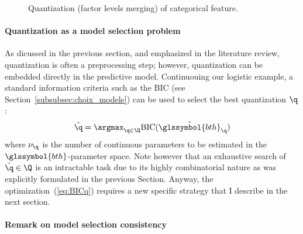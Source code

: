 \begin{figure}
\begin{multicols}{2}
\begin{minipage}{0.45\textwidth}
\caption{\label{fig:disc_disc} Quantization (factor levels merging) of categorical feature.}
\end{minipage}
\end{multicols}
\end{figure}




\paragraph{Quantization as a model selection problem} \label{par:model_selec}

As dicussed in the previous section, and emphasized in the literature review, quantization is often a preprocessing step; however, quantization can be embedded directly in the predictive model. Continuouing our logistic example, a standard information criteria such as the BIC (see Section~\ref{subsubsec:choix_modele}) can be used to select the best quantization $\q$:
\begin{equation}
    \label{eq:BICq}
    \hat{\q}=\argmax_{\q \in \Q} \text{BIC}(\hat{\glssymbol{bth}}_\q)
\end{equation}
where $\nu_\q$ is the number of continuous parameters to be estimated in the $\glssymbol{bth}$-parameter space. Note however that an exhaustive search of $\hat{\q}\in\Q$ is an intractable task due to its highly combinatorial nature as was explicitly formulated in the previous Section. Anyway, the optimization~(\ref{eq:BICq}) requires a new specific strategy that I describe in the next section.

\paragraph{Remark on model selection consistency}


